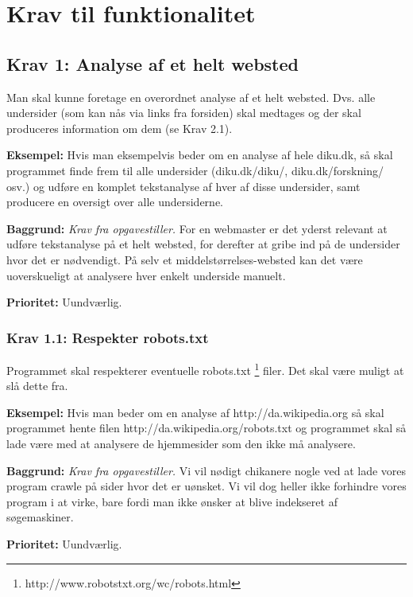 \documentclass[a4paper,oneside,article, titlepage]{article}
\begin{document}
\newpage

\section{Krav til funktionalitet}
\subsection{Krav 1: Analyse af et helt websted}
Man skal kunne foretage en overordnet analyse af et helt
websted. Dvs. alle undersider (som kan nås via links fra forsiden)
skal medtages og der skal produceres information om dem (se Krav 2.1).

\begin{description}
\item \textbf{Eksempel:}
  Hvis man eksempelvis beder om en analyse af hele diku.dk, så skal
programmet finde frem til alle undersider (diku.dk/diku/,
diku.dk/forskning/ osv.) og udføre en komplet tekstanalyse af hver af
disse undersider, samt producere en oversigt over alle undersiderne.

\item \textbf{Baggrund:} \textit{Krav fra opgavestiller.} For en webmaster er
  det yderst relevant at udføre tekstanalyse på et helt websted, for
  derefter at gribe ind på de undersider hvor det er nødvendigt. På
  selv et middelstørrelses-websted kan det være uoverskueligt at
  analysere hver enkelt underside manuelt.

\item \textbf{Prioritet:} Uundværlig.
\end{description}

\subsubsection {Krav 1.1: Respekter robots.txt}
Programmet skal respekterer eventuelle robots.txt
\footnote{http://www.robotstxt.org/wc/robots.html} filer. Det skal
være muligt at slå dette fra.

\begin{description}
\item \textbf{Eksempel:} Hvis man beder om en analyse af
  http://da.wikipedia.org så skal programmet hente filen
  http://da.wikipedia.org/robots.txt og programmet skal så lade være
  med at analysere de hjemmesider som den ikke må analysere.

\item \textbf{Baggrund:} \textit{Krav fra opgavestiller.} Vi vil
  nødigt chikanere nogle ved at lade vores program crawle på sider
  hvor det er uønsket. Vi vil dog heller ikke forhindre vores program
  i at virke, bare fordi man ikke ønsker at blive indekseret af
  søgemaskiner.
\item \textbf{Prioritet:} Uundværlig.
\end{description}
\end{document}
